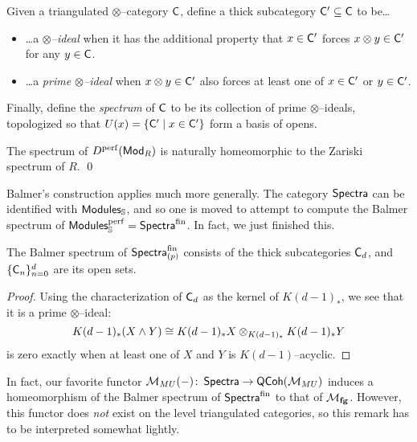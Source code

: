 \begin{definition}
Given a triangulated $\otimes$--category $\mathsf{C}$, define a thick subcategory $\mathsf{C}' \subseteq \mathsf{C}$ to be\ldots
\begin{itemize}
\item \ldots a \textit{$\otimes$--ideal} when it has the additional property that $x \in \mathsf{C}'$ forces $x \otimes y \in \mathsf{C}'$ for any $y \in \mathsf{C}$.
\item \ldots a \textit{prime $\otimes$--ideal} when $x \otimes y \in \mathsf{C}'$ also forces at least one of $x \in \mathsf{C}'$ or $y \in \mathsf{C}'$.
\end{itemize}
Finally, define the \textit{spectrum} of $\mathsf{C}$ to be its collection of prime $\otimes$--ideals, topologized so that $U(x) = \{\mathsf{C}' \mid x \in \mathsf{C}'\}$ form a basis of opens.
\end{definition}

\begin{theorem}[Balmer]
The spectrum of $D^{\mathrm{perf}}(\mathsf{Mod}_R)$ is naturally homeomorphic to the Zariski spectrum of $R$. \qed
\end{theorem}

Balmer's construction applies much more generally.  The category $\mathsf{Spectra}$ can be identified with $\mathsf{Modules}_{\mathbb S}$, and so one is moved to attempt to compute the Balmer spectrum of $\mathsf{Modules}_{\mathbb S}^{\mathrm{perf}} = \mathsf{Spectra}^{\mathrm{fin}}$.  In fact, we just finished this.
\begin{theorem}
The Balmer spectrum of $\mathsf{Spectra}_{(p)}^{\mathrm{fin}}$ consists of the thick subcategories $\mathsf{C}_d$, and $\{\mathsf{C}_n\}_{n=0}^d$ are its open sets.
\end{theorem}
\begin{proof}
Using the characterization of $\mathsf{C}_d$ as the kernel of $K(d-1)_*$, we see that it is a prime $\otimes$--ideal: \[K(d-1)_*(X \wedge Y) \cong K(d-1)_* X \otimes_{K(d-1)_*} K(d-1)_* Y\] is zero exactly when at least one of $X$ and $Y$ is $K(d-1)$--acyclic.
\end{proof}

\begin{remark}
In fact, our favorite functor $\mathcal{M}_{MU}(-)\colon\thinspace \mathsf{Spectra} \to \mathsf{QCoh}(\mathcal{M}_{MU})$ induces a homeomorphism of the Balmer spectrum of $\mathsf{Spectra}^{\mathrm{fin}}$ to that of $\mathcal{M}_{\mathbf{fg}}$.  However, this functor does \emph{not} exist on the level triangulated categories, so this remark has to be interpreted somewhat lightly.
\end{remark}





